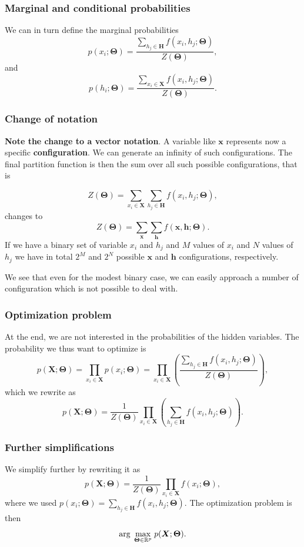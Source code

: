 \documentclass{beamer}
\begin{document}
\begin{frame}
\frametitle{Marginal and conditional probabilities}

We can in turn define the marginal probabilities
\[
p(x_i;\bm{\Theta}) = \frac{\sum_{h_j\in \bm{H}}f(x_i,h_j;\bm{\Theta})}{Z(\bm{\Theta})},
\]
and 
\[
p(h_i;\bm{\Theta}) = \frac{\sum_{x_i\in \bm{X}}f(x_i,h_j;\bm{\Theta})}{Z(\bm{\Theta})}.
\]
\end{frame}

\begin{frame}
\frametitle{Change of notation}

\textbf{Note the change to a vector notation}. A variable like $\bm{x}$
represents now a specific \textbf{configuration}. We can generate an infinity
of such configurations. The final partition function is then the sum
over all such possible configurations, that is

\[
Z(\bm{\Theta})=\sum_{x_i\in \bm{X}}\sum_{h_j\in \bm{H}} f(x_i,h_j;\bm{\Theta}),
\]
changes to
\[
Z(\bm{\Theta})=\sum_{\bm{x}}\sum_{\bm{h}} f(\bm{x},\bm{h};\bm{\Theta}).
\]
If we have a binary set of variable $x_i$ and $h_j$ and $M$ values of $x_i$ and $N$ values of $h_j$ we have in total $2^M$ and $2^N$ possible $\bm{x}$ and $\bm{h}$ configurations, respectively.

We see that even for the modest binary case, we can easily approach a
number of configuration which is not possible to deal with.
\end{frame}

\begin{frame}
\frametitle{Optimization problem}

At the end, we are not interested in the probabilities of the hidden variables. The probability we thus want to optimize is 
\[
p(\bm{X};\bm{\Theta})=\prod_{x_i\in \bm{X}}p(x_i;\bm{\Theta})=\prod_{x_i\in \bm{X}}\left(\frac{\sum_{h_j\in \bm{H}}f(x_i,h_j;\bm{\Theta})}{Z(\bm{\Theta})}\right),
\]
which we rewrite as
\[
p(\bm{X};\bm{\Theta})=\frac{1}{Z(\bm{\Theta})}\prod_{x_i\in \bm{X}}\left(\sum_{h_j\in \bm{H}}f(x_i,h_j;\bm{\Theta})\right).
\]
\end{frame}

\begin{frame}
\frametitle{Further simplifications}

We simplify further by rewriting it as
\[
p(\bm{X};\bm{\Theta})=\frac{1}{Z(\bm{\Theta})}\prod_{x_i\in \bm{X}}f(x_i;\bm{\Theta}),
\]
where we used $p(x_i;\bm{\Theta}) = \sum_{h_j\in \bm{H}}f(x_i,h_j;\bm{\Theta})$.
The optimization problem is then
\[
{\displaystyle \mathrm{arg} \hspace{0.1cm}\max_{\bm{\bm{\Theta}}\in {\mathbb{R}}^{p}}} \hspace{0.1cm}p(\bm{X};\bm{\Theta}).
\]
\end{frame}
\end{document}
